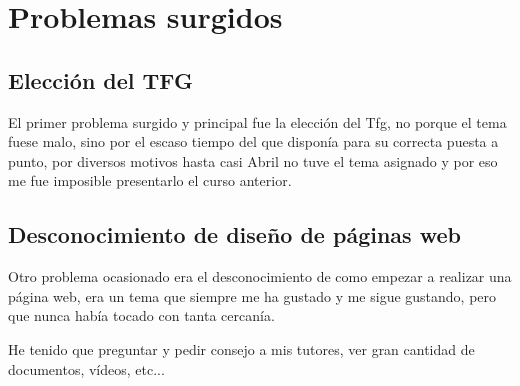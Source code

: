 \section{Problemas surgidos}

\subsection{Elección del TFG}

El primer problema surgido y principal fue la elección del Tfg, no porque el tema fuese malo, sino por el escaso tiempo del que disponía para su correcta puesta a punto, por diversos motivos hasta casi Abril no tuve el tema asignado y por eso me fue imposible presentarlo el curso anterior.

\subsection{Desconocimiento de diseño de páginas web}

Otro problema ocasionado era el desconocimiento de como empezar a realizar una página web, era un tema que siempre me ha gustado y me sigue gustando, pero que nunca había tocado con tanta cercanía.

He tenido que preguntar y pedir consejo a mis tutores, ver gran cantidad de documentos, vídeos, etc...
